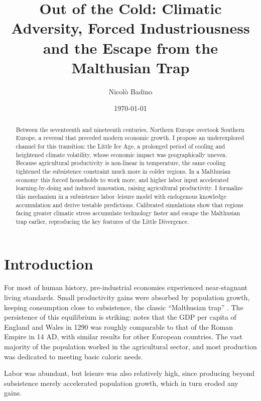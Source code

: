 \documentclass[11pt,a4paper]{article}
\title{Out of the Cold: Climatic Adversity, Forced Industriousness and the Escape from the Malthusian Trap}
\author{Nicolò Badino}
\date{\today}
\begin{document}
\maketitle

\begin{abstract}
  Between the seventeenth and nineteenth centuries, Northern Europe overtook Southern Europe, a reversal that preceded modern economic growth.
  I propose an underexplored channel for this transition: the Little Ice Age, a prolonged period of cooling and heightened climate volatility, whose economic impact was geographically uneven.
  Because agricultural productivity is non-linear in temperature, the same cooling tightened the subsistence constraint much more in colder regions. In a Malthusian economy this forced households to work more, and higher labor input accelerated learning-by-doing and induced innovation, raising agricultural productivity.
  I formalize this mechanism in a subsistence labor--leisure model with endogenous knowledge accumulation and derive testable predictions. Calibrated simulations show that regions facing greater climatic stress accumulate technology faster and escape the Malthusian trap earlier, reproducing the key features of the Little Divergence.
\end{abstract}
\section{Introduction}

For most of human history, pre-industrial economies experienced near-stagnant living standards. Small productivity gains were absorbed by population growth, keeping consumption close to subsistence, the classic ``Malthusian trap'' \parencite{Clark2008, AshrafGalor2011}. The persistence of this equilibrium is striking: \textcite{Milanovic2011} notes that the GDP per capita of England and Wales in 1290 was roughly comparable to that of the Roman Empire in 14 AD, with similar results for other European countries.
The vast majority of the population worked in the agricultural sector, and most production was dedicated to meeting basic caloric needs. %

Labor was abundant, but leisure was also relatively high, since producing beyond subsistence merely accelerated population growth, which in turn eroded any gains.
\end{document}
